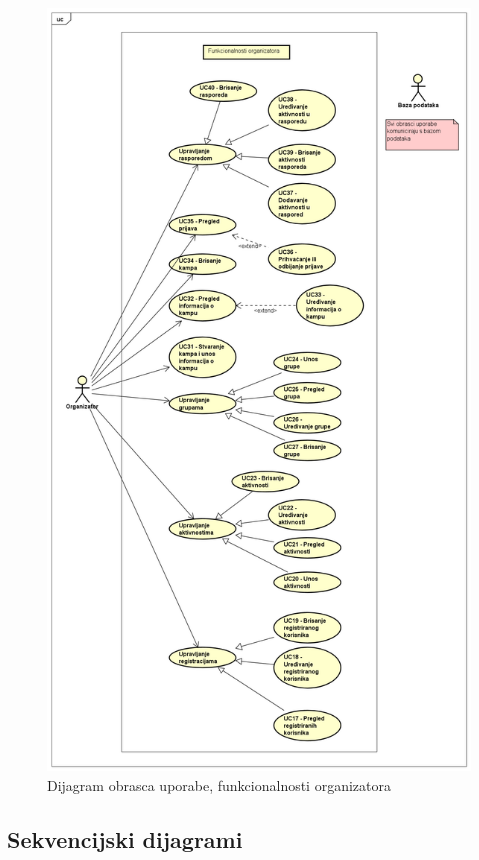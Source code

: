 				\begin{figure}[H]
					\centerline{\includegraphics[width=\textwidth, height=0.9\textheight]{slike/UC_organizator.png}}
					\caption{Dijagram obrasca uporabe, funkcionalnosti organizatora}
					\label{fig:ucOrganizator}
				\end{figure}
			
			
			\eject		
				
			\subsection{Sekvencijski dijagrami}
				
